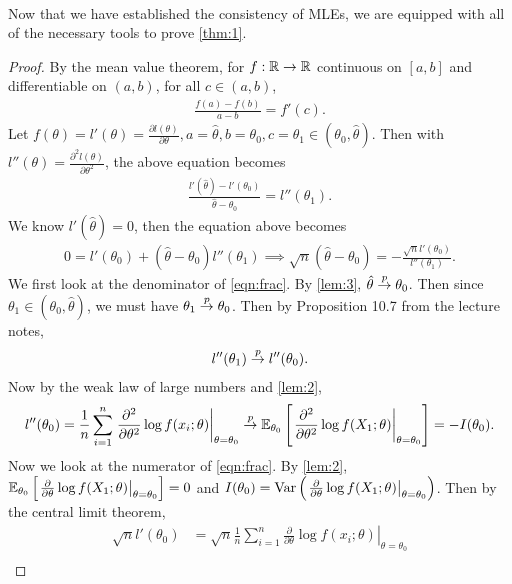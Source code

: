 $ $\\
Now that we have established the consistency of MLEs, we are equipped with all of the necessary tools to prove \cref{thm:1}.
\begin{proof}
By the mean value theorem, for $f:\mathbb{R} \rightarrow \mathbb{R}$ continuous on $[a,b]$ and differentiable on $(a,b)$, for all $c\in(a,b)$,
\begin{align*}
\frac{f(a)-f(b)}{a-b} = f'(c).
\end{align*}
Let $f(\theta) = l'(\theta) = \frac{\partial l(\theta)}{\partial \theta}, a=\hat{\theta}, b=\theta_0, c=\theta_1 \in (\theta_0, \hat{\theta})$. Then with $l''(\theta) = \frac{\partial^2 l(\theta)}{\partial \theta^2}$, the above equation becomes
\begin{align*}
\frac{l'(\hat{\theta}) - l'(\theta_0)}{\hat{\theta} - \theta_0} = l''(\theta_1).
\end{align*}
We know $l'(\hat{\theta}) = 0$, then the equation above becomes
\begin{align}
0 = l'(\theta_0) + (\hat{\theta} - \theta_0)l''(\theta_1) \implies \sqrt{n}(\hat{\theta} - \theta_0) = -\frac{\sqrt{n}l'(\theta_0)}{l''(\theta_1)}. \label{eqn:frac}
\end{align}
We first look at the denominator of \cref{eqn:frac}. By \cref{lem:3}, $\hat{\theta} \overset{p}{\rightarrow} \theta_0$. Then since $\theta_1\in(\theta_0, \hat{\theta})$, we must have $\theta_1 \overset{p}{\rightarrow} \theta_0$. Then by Proposition 10.7 from the lecture notes, 
\begin{align*}
l''(\theta_1) \overset{p}{\rightarrow} l''(\theta_0).
\end{align*}
Now by the weak law of large numbers and \cref{lem:2},
\begin{align}
l''(\theta_0) = \frac{1}{n}\sum_{i=1}^n \left.\frac{\partial^2}{\partial \theta^2}\log f(x_i; \theta)\right\vert_{\theta=\theta_0} \overset{p}{\rightarrow} \mathbb{E}_{\theta_0}\left[ \left.\frac{\partial^2}{\partial \theta^2}\log f(X_1; \theta)\right\vert_{\theta=\theta_0} \right] = -I(\theta_0). \label{eqn:denom}
\end{align}
Now we look at the numerator of \cref{eqn:frac}. By \cref{lem:2}, $\mathbb{E}_{\theta_0}\left[ \left.\frac{\partial}{\partial\theta}\log f(X_1;\theta)\right\vert_{\theta=\theta_0} \right] = 0$ and $I(\theta_0) = \text{Var}\left( \left.\frac{\partial}{\partial\theta}\log f(X_1;\theta)\right\vert_{\theta=\theta_0} \right)$. Then by the central limit theorem,
\begin{align}
\sqrt{n}l'(\theta_0) &= \sqrt{n}\frac{1}{n}\sum_{i=1}^n \left.\frac{\partial}{\partial\theta}\log f(x_i;\theta)\right\vert_{\theta=\theta_0}\nonumber\\

\end{align}
\end{proof}
